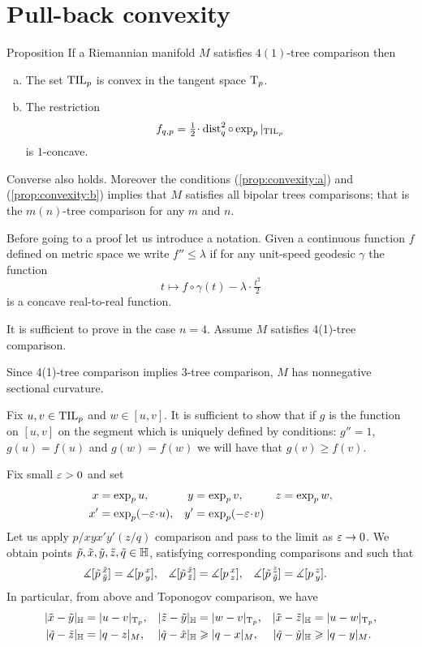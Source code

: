 \section{Pull-back convexity}\label{convexity}

\begin{thm}{Proposition}\label{prop:convexity}
If a Riemannian manifold $M$ satisfies $4(1)$-tree comparison then
\begin{enumerate}[(a)]
\item\label{prop:convexity:a} The set $\TIL_p$ is convex in the tangent space $\T_p$.
\item\label{prop:convexity:b} The restriction  
\[f_{q,p}=\tfrac12\cdot\dist_q^2\circ\exp_p|_{\TIL_p}\] 
is $1$-concave.
\end{enumerate}

Converse also holds.
Moreover the conditions (\ref{prop:convexity:a}) and (\ref{prop:convexity:b}) implies that $M$ satisfies all bipolar trees comparisons; that is the $m(n)$-tree comparison for any $m$ and $n$.
\end{thm}

Before going to a proof let us introduce a notation.
Given a continuous function $f$ defined on metric space we write 
$f''\le \lambda$ if for any unit-speed geodesic $\gamma$ the function
\[t\mapsto f\circ\gamma(t)-\lambda\cdot \tfrac{t^2}{2}\]
is a concave real-to-real function.

It is sufficient to prove in the case $n=4$.
Assume $M$ satisfies 4(1)-tree comparison.

Since 4(1)-tree comparison implies 3-tree comparison,
$M$ has nonnegative sectional curvature.

Fix $u,v\in \TIL_p$ and $w\in [u,v]$.
It is sufficient to show that if $g$ is the function on $[u,v]$ on the segment which is 
uniquely defined by conditions:
$g''=1$, $g(u)=f(u)$ and $g(w)=f(w)$ we will have that $g(v)\ge f(v)$.

Fix small $\eps>0$ and set
\begin{align*}
x&=\exp_p u, 
&y&=\exp_p v, 
&z&=\exp_pw,
\\
x'&=\exp_p(-\eps\cdot  u),
&y'&=\exp_p(-\eps\cdot  v)
\end{align*}
Let us apply $p/xyx'y'(z/q)$ comparison and pass to the limit as $\eps\to 0$.
We obtain points $\~p, \~x, \~y, \~z, \~q\in\HH$, satisfying corresponding comparisons and
such that
\begin{align*}
\measuredangle[\~p\,^{\~x}_{\~y}]&= \measuredangle[p\,^{x}_{y}],
&\measuredangle[\~p\,^{\~x}_{\~z}]&= \measuredangle[p\,^{x}_{z}],
&\measuredangle[\~p\,^{\~z}_{\~y}]&= \measuredangle[p\,^{z}_{y}].
\end{align*}
In particular,
from above and Toponogov comparison, we have
\begin{align*}
|\~x-\~y|_\HH&=|u-v|_{\T_p},
&|\~z-\~y|_\HH&=|w-v|_{\T_p},
&|\~x-\~z|_\HH&=|u-w|_{\T_p},
\\
|\~q-\~z|_\HH&=|q-z|_M,
&|\~q-\~x|_\HH&\ge|q-x|_M,
&|\~q-\~y|_\HH&\ge|q-y|_M.
\end{align*}

